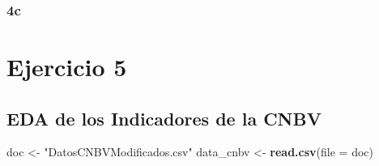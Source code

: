 \documentclass[
]{article}
\newenvironment{Shaded}{\begin{snugshade}}{\end{snugshade}}
\newcommand{\DataTypeTok}[1]{\textcolor[rgb]{0.13,0.29,0.53}{#1}}
\newcommand{\KeywordTok}[1]{\textcolor[rgb]{0.13,0.29,0.53}{\textbf{#1}}}
\newcommand{\NormalTok}[1]{#1}
\newcommand{\OperatorTok}[1]{\textcolor[rgb]{0.81,0.36,0.00}{\textbf{#1}}}
\newcommand{\StringTok}[1]{\textcolor[rgb]{0.31,0.60,0.02}{#1}}
\begin{document}
\hypertarget{c-1}{%
\subsubsection{4c}\label{c-1}}

\begin{Shaded}
\end{Shaded}

\hypertarget{ejercicio-5}{%
\section{Ejercicio 5}\label{ejercicio-5}}

\hypertarget{eda-de-los-indicadores-de-la-cnbv}{%
\subsection{EDA de los Indicadores de la
CNBV}\label{eda-de-los-indicadores-de-la-cnbv}}

\begin{Shaded}
\begin{Highlighting}[]
\NormalTok{doc <-}\StringTok{ "DatosCNBVModificados.csv"}
\NormalTok{data_cnbv <-}\StringTok{ }\KeywordTok{read.csv}\NormalTok{(}\DataTypeTok{file =}\NormalTok{ doc)}
\end{Highlighting}
\end{Shaded}
\end{document}

